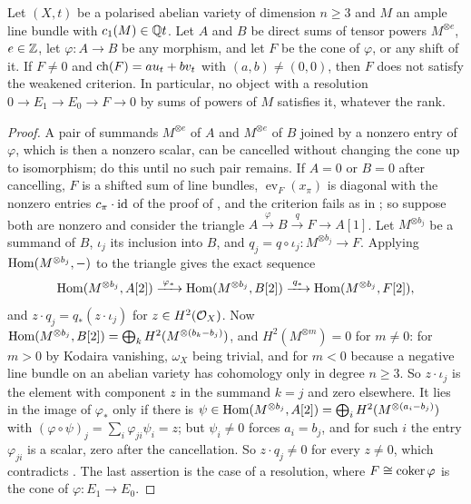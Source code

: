 \begin{theorem}\label{thm:nosplit}
Let $(X,t)$ be a polarised abelian variety of dimension $n\ge3$ and $M$ an
ample line bundle with $c_{1}(M)\in\mathbb{Q} t$. Let $A$ and $B$ be direct sums of
tensor powers $M^{\otimes e}$, $e\in\mathbb{Z}$, let $\varphi\colon A\to B$ be any
morphism, and let $F$ be the cone of $\varphi$, or any shift of it. If $F\ne0$
and $\operatorname{ch}(F)=au_{t}+bv_{t}$ with $(a,b)\ne(0,0)$, then $F$ does not satisfy
the weakened criterion. In particular, no object with a resolution
$0\to E_{1}\to E_{0}\to F\to0$ by sums of powers of $M$ satisfies it,
whatever the rank.
\end{theorem}

\begin{proof}
A pair of summands $M^{\otimes e}$ of $A$ and $M^{\otimes e}$ of $B$ joined
by a nonzero entry of $\varphi$, which is then a nonzero scalar, can be
cancelled without changing the cone up to isomorphism; do this until no such
pair remains. If $A=0$ or $B=0$ after cancelling, $F$ is a shifted sum of
line bundles, $\operatorname{ev}_{F}(x_{\pi})$ is diagonal with the nonzero
entries $c_{\pi}\cdot\operatorname{id}$ of the proof of , and the
criterion fails as in ; so suppose both are nonzero and
consider the triangle $A\xrightarrow{\varphi}B\xrightarrow{\;q\;}F\to A[1]$.
Let $M^{\otimes b_{j}}$ be a summand of $B$, $\iota_{j}$ its inclusion into
$B$, and $q_{j}=q\circ\iota_{j}\colon M^{\otimes b_{j}}\to F$. Applying
$\operatorname{Hom}(M^{\otimes b_{j}},-)$ to the triangle gives the exact sequence
\[
  \operatorname{Hom}(M^{\otimes b_{j}},A[2])\xrightarrow{\;\varphi_{*}\;}
  \operatorname{Hom}(M^{\otimes b_{j}},B[2])\xrightarrow{\;q_{*}\;}
  \operatorname{Hom}(M^{\otimes b_{j}},F[2]),
\]
and $z\cdot q_{j}=q_{*}(z\cdot\iota_{j})$ for $z\in H^{2}(\mathcal{O}_{X})$. Now
$\operatorname{Hom}(M^{\otimes b_{j}},B[2])=\bigoplus_{k}H^{2}(M^{\otimes(b_{k}-b_{j})})$,
and $H^{2}(M^{\otimes m})=0$ for $m\ne0$: for $m>0$ by Kodaira vanishing,
$\omega_{X}$ being trivial, and for $m<0$ because a negative line bundle on
an abelian variety has cohomology only in degree $n\ge3$. So $z\cdot\iota_{j}$
is the element with component $z$ in the summand $k=j$ and zero elsewhere. It
lies in the image of $\varphi_{*}$ only if there is
$\psi\in\operatorname{Hom}(M^{\otimes b_{j}},A[2])=\bigoplus_{i}H^{2}(M^{\otimes(a_{i}-b_{j})})$
with $(\varphi\circ\psi)_{j}=\sum_{i}\varphi_{ji}\psi_{i}=z$; but $\psi_{i}\ne0$
forces $a_{i}=b_{j}$, and for such $i$ the entry $\varphi_{ji}$ is a scalar,
zero after the cancellation. So $z\cdot q_{j}\ne0$ for every $z\ne0$, which
contradicts . The last assertion is the case of a
resolution, where $F\cong\operatorname{coker}\varphi$ is the cone of $\varphi\colon E_{1}\to E_{0}$.
\end{proof}

